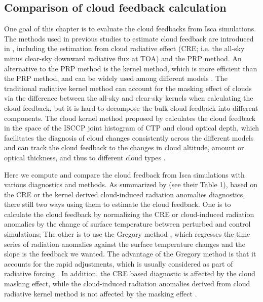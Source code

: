 
\subsection{Comparison of cloud feedback calculation}
\label{sec:cmp_cld_fbk_method_result}


One goal of this chapter is to evaluate the cloud feedbacks from Isca simulations. The methods used in previous studies to estimate cloud feedback are introduced in , including the estimation from cloud radiative effect (CRE; i.e. the all-sky minus clear-sky downward radiative flux at TOA) and the PRP method. An alternative to the PRP method is the kernel method, which is more efficient than the PRP method, and can be widely used among different models \citep{Soden2006,Soden2008}. The traditional radiative kernel method can account for the masking effect of clouds via the difference between the all-sky and clear-sky kernels when calculating the cloud feedback, but it is hard to decompose the bulk cloud feedback into different components. The cloud kernel method proposed by \cite{Zelinka2012computing1,Zelinka2012computing2} calculates the cloud feedback in the space of the ISCCP joint histogram of CTP and cloud optical depth, which facilitates the diagnosis of cloud changes consistently across the different models and can track the cloud feedback to the changes in cloud altitude, amount or optical thickness, and thus to different cloud types \citep{Siebesma2020clouds}. 

Here we compute and compare the cloud feedback from Isca simulations with various diagnostics and methods. As summarized by \cite{Zelinka2013} (see their Table 1), based on the CRE or the kernel derived cloud-induced radiation anomalies diagnostics, there still two ways using them to estimate the cloud feedback. One is to calculate the cloud feedback by normalizing the CRE or cloud-induced radiation anomalies by the change of surface temperature between perturbed and control simulations; The other is to use the Gregory method \citep{Gregory2004}, which regresses the time series of radiation anomalies against the surface temperature changes and the slope is the feedback we wanted. The advantage of the Gregory method is that it accounts for the rapid adjustments, which is usually considered as part of radiative forcing \citep{Andrews2012cloud,Siebesma2020clouds}. In addition, the CRE based diagnostic is affected by the cloud masking effect, while the cloud-induced radiation anomalies derived from cloud radiative kernel method is not affected by the masking effect \citep{Zelinka2013}.

